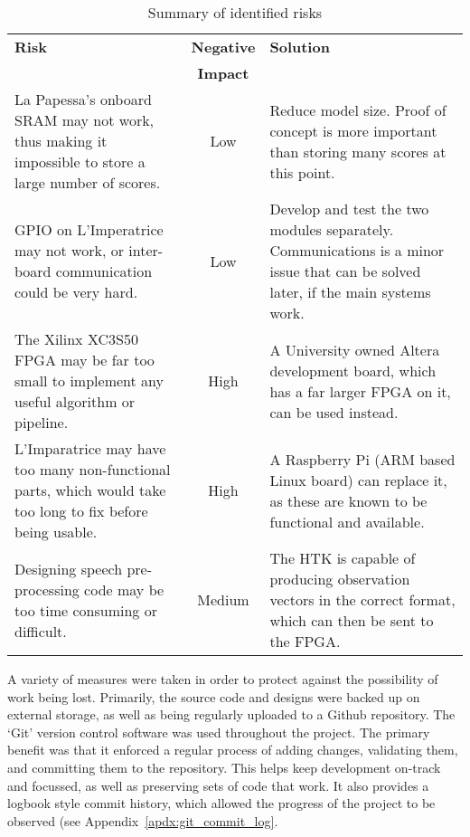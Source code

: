 	\begin{table}[tb]
		\caption{Summary of identified risks}
		\label{tab:risks}
		\begin{center}
			\begin{tabular}{ p{} | c | p{}}
			\hline
			\hline
			\textbf{Risk} & \textbf{Negative} & \textbf{Solution}
			\\            & \textbf{Impact}   & \\
			\hline
				La Papessa's onboard SRAM may not work, thus making it impossible to store a large number of scores.
					& Low
					& Reduce model size. Proof of concept is more important than storing many scores at this point.
					\\ \hline
				GPIO on L'Imperatrice may not work, or inter-board communication could be very hard.
					& Low
					& Develop and test the two modules separately.  Communications is a minor issue that can be solved later, if the main systems work.
					\\ \hline
				The Xilinx XC3S50 FPGA may be far too small to implement any useful algorithm or pipeline.
					& High
					& A University owned Altera development board, which has a far larger FPGA on it, can be used instead.
					\\ \hline
				L'Imparatrice may have too many non-functional parts, which would take too long to fix before being usable.
					& High
					& A Raspberry Pi (ARM based Linux board) can replace it, as these are known to be functional and available.
					\\ \hline
				Designing speech pre-processing code may be too time consuming or difficult.
					& Medium
					& The HTK is capable of producing observation vectors in the correct format, which can then be sent to the FPGA.
					\\
			\hline
			\hline
			\end{tabular}
		\end{center}
	\end{table}

	A variety of measures were taken in order to protect against the possibility of work being lost.  Primarily, the source code and designs were backed up on external storage, as well as being regularly uploaded to a Github repository.  The `Git' version control software was used throughout the project.  The primary benefit was that it enforced a regular process of adding changes, validating them, and committing them to the repository.  This helps keep development on-track and focussed, as well as preserving sets of code that work.  It also provides a logbook style commit history, which allowed the progress of the project to be observed (see Appendix~\ref{apdx:git_commit_log}.

